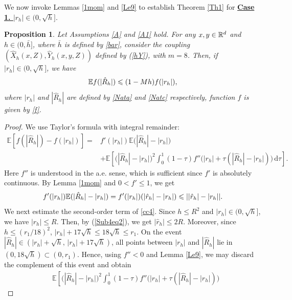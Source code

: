 \documentclass[aap]{imsart}
\theoremstyle{plain}
\newtheorem{proposition}{Proposition}
\theoremstyle{definition}
\begin{document}
We now invoke Lemmas \ref{1mom} and \ref{Le9} to establish Theorem \ref{Th1} for \underline{\bf{Case 1. \textit{ $|r_h|\in(0, \sqrt{h}]$}}}.
\begin{proposition}\label{PR1}
Let Assumptions \ref{A} and \ref{A1} hold. For any $x, y\in\mathbb{R}^d$ and \(h \in (0, \bar{h}]\), where $\bar{h}$ is defined by \eqref{bar}, consider the coupling $(\hat{X}_h(x,Z), \hat{Y}_h(x,y,Z))$ defined by (\ref{hY}), with $m=8$. Then, if $|r_h|\in(0, \sqrt{h}]$, we have
\begin{equation*}
\mathbb{E} f(|\hat{R}_h|)\leqslant (1-Mh)f(|r_h|),
\end{equation*}
where $|r_h|$ and $|\hat{R}_h|$ are defined by \eqref{Nata} and \eqref{Natc} respectively, function $f$ is given by \eqref{f}.
\end{proposition}
\begin{proof}
We use Taylor's formula with
integral remainder:
\begin{equation}\label{cc4}
\begin{aligned}
	\mathbb E\left[f(|\hat R_h|)-f(|r_h|)\right]=&
	f'(|r_h|)
	\mathbb E\bigl(|\hat R_h|-|r_h|\bigr)               \\
	&+
	\mathbb E\left[
	\bigl(|\hat R_h|-|r_h|\bigr)^2
	\int_0^1
	(1-\tau)
	f''\bigl(|r_h|+\tau(|\hat R_h|-|r_h|))
	\,\mathrm d\tau
	\right].
\end{aligned}	
\end{equation}
Here \(f''\) is understood in the a.e. sense, which is sufficient since \(f'\) is absolutely continuous.
By Lemma \ref{1mom} and $0<f'\leqslant 1$, we get
\begin{equation}\label{cc5}
f'(|r_h|)\mathbb{E}(|\hat{R}_h|-|r_h|) = f'(|r_h|)(|\hat{r}_h|-|r_h|)\leqslant ||\hat{r}_h|-|r_h||.
\end{equation} 
We next estimate the second-order term of \eqref{cc4}. Since  $h\leqslant R^2$ and $|r_h|\in(0, \sqrt{h}]$, we have $|r_h|\leqslant R$. Then, by (\ref{Sub4eq2}), we get $|\hat{r}_h|\leqslant 2R$. 
Moreover, since \(h\leqslant (r_1/18)^2\), \(|r_h|+17\sqrt h
\leqslant 18\sqrt h
\leqslant r_1\).
On the event \(|\hat R_h|\in(|r_h|+\sqrt h,\,|r_h|+17\sqrt h)\),
all points between \(|r_h|\) and \(|\hat R_h|\) lie in
\((0,18\sqrt h)\subset(0,r_1)\). Hence, using \(f''<0\) and Lemma \ref{Le9}, we may discard the
complement of this event and obtain
\begin{equation}\label{Tqq1}
\begin{aligned}
	&\mathbb E\left[
	\bigl(|\hat R_h|-|r_h|\bigr)^2
	\int_0^1
	(1-\tau)
	f''\bigl(|r_h|+\tau(|\hat R_h|-|r_h|)\bigr)

\end{aligned}
\end{equation}
\end{proof}
\end{document}
